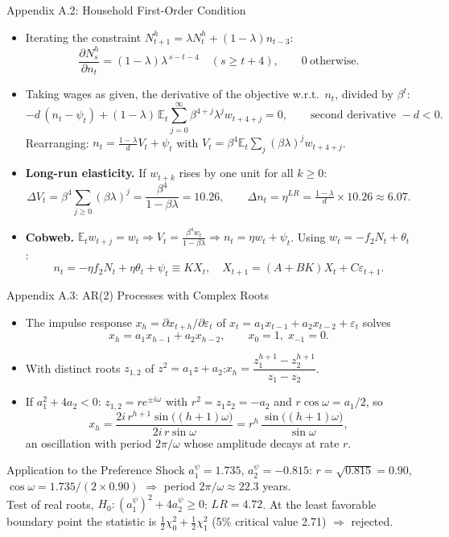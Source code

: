 \documentclass[10pt]{beamer}
\newcommand{\E}{\mathbb{E}}
\begin{document}
\begin{frame}{Appendix A.2: Household First-Order Condition}
  \footnotesize
  \begin{itemize}
    \item Iterating the constraint $N^h_{t+1}=\lambda N^h_t+(1-\lambda)n_{t-3}$:
      \[ \frac{\partial N^h_s}{\partial n_t}=(1-\lambda)\lambda^{\,s-t-4}\quad (s\ge t+4),\qquad 0\ \text{otherwise}. \]
    \item Taking wages as given, the derivative of the objective w.r.t.\ $n_t$, divided by $\beta^t$:
      \[ -d\,(n_t-\psi_t)+(1-\lambda)\,\E_t\sum_{j=0}^\infty\beta^{4+j}\lambda^j w_{t+4+j}=0,
         \qquad \text{second derivative } -d<0 . \]
      Rearranging: $n_t=\frac{1-\lambda}{d}V_t+\psi_t$ with $V_t=\beta^4\E_t\sum_j(\beta\lambda)^jw_{t+4+j}$.
    \item \textbf{Long-run elasticity.} If $w_{t+k}$ rises by one unit for all $k\ge0$:
      \[ \Delta V_t=\beta^4\sum_{j\ge0}(\beta\lambda)^j=\frac{\beta^4}{1-\beta\lambda}=10.26,
         \qquad \Delta n_t=\eta^{LR}=\tfrac{1-\lambda}{d}\times10.26\approx6.07 . \]
    \item \textbf{Cobweb.} $\E_tw_{t+j}=w_t\Rightarrow V_t=\frac{\beta^4w_t}{1-\beta\lambda}\Rightarrow n_t=\eta w_t+\psi_t$. Using $w_t=-f_2N_t+\theta_t$:
      \[ n_t=-\eta f_2N_t+\eta\theta_t+\psi_t\equiv KX_t,\quad X_{t+1}=(A+BK)X_t+C\varepsilon_{t+1}. \]
  \end{itemize}
\end{frame}

\begin{frame}{Appendix A.3: AR(2) Processes with Complex Roots}
  \small
  \begin{itemize}
    \item The impulse response $x_h=\partial x_{t+h}/\partial\varepsilon_t$ of $x_t=a_1x_{t-1}+a_2x_{t-2}+\varepsilon_t$ solves
      \[ x_h=a_1x_{h-1}+a_2x_{h-2},\qquad x_0=1,\; x_{-1}=0 . \]
    \item With distinct roots $z_{1,2}$ of $z^2=a_1z+a_2$:\quad $x_h=\dfrac{z_1^{h+1}-z_2^{h+1}}{z_1-z_2}$.
    \item If $a_1^2+4a_2<0$: $z_{1,2}=re^{\pm i\omega}$ with $r^2=z_1z_2=-a_2$ and $r\cos\omega=a_1/2$, so
      \[ x_h=\frac{2i\,r^{h+1}\sin\big((h+1)\omega\big)}{2i\,r\sin\omega}
            =r^h\,\frac{\sin\big((h+1)\omega\big)}{\sin\omega}, \]
      an oscillation with period $2\pi/\omega$ whose amplitude decays at rate $r$.
  \end{itemize}
  \begin{block}{Application to the Preference Shock}
    $a_1^\psi=1.735$, $a_2^\psi=-0.815$: $r=\sqrt{0.815}=0.90$, $\cos\omega=1.735/(2\times0.90)$ $\Rightarrow$ period $2\pi/\omega\approx22.3$ years.\\[0.5ex]
    Test of real roots, $H_0:(a_1^\psi)^2+4a_2^\psi\ge0$: $LR=4.72$. At the least favorable boundary point the statistic is $\tfrac12\chi^2_0+\tfrac12\chi^2_1$ (5\% critical value 2.71) $\Rightarrow$ \alert{rejected}.
  \end{block}
\end{frame}
\end{document}
